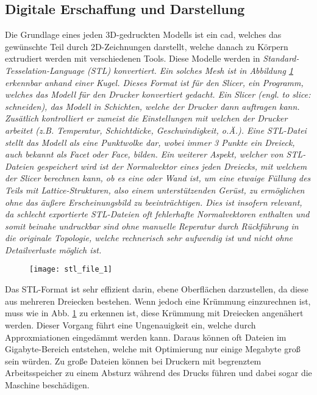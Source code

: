 \documentclass[../main.tex]{subfiles}
\begin{document}
\subsection{Digitale Erschaffung und Darstellung}
Die Grundlage eines jeden 3D-gedruckten Modells ist ein \acrfull{cad}, welches das gewünschte Teil durch 2D-Zeichnungen darstellt, welche danach zu Körpern extrudiert werden mit verschiedenen Tools. Diese Modelle werden  in \it{Standard-Tesselation-Language} (STL) konvertiert. Ein solches \it{Mesh} ist in Abbildung \ref{img:stl_1} erkennbar anhand einer Kugel. Dieses Format ist für den \it{Slicer}, ein Programm, welches das Modell für den Drucker konvertiert gedacht. Ein Slicer (engl. \it{to slice}: schneiden),  das Modell in Schichten, welche der Drucker dann auftragen kann. Zusätlich kontrolliert er zumeist die Einstellungen mit welchen der Drucker arbeitet (z.B. Temperatur, Schichtdicke, Geschwindigkeit, o.Ä.). Eine STL-Datei stellt das Modell als eine Punktwolke dar, wobei immer 3 Punkte ein Dreieck, auch bekannt als \it{Facet} oder \it{Face}, bilden. Ein weiterer Aspekt, welcher von STL-Dateien gespeichert wird ist der Normalvektor eines jeden Dreiecks, mit welchem der Slicer berechnen kann, ob es eine  oder  Wand ist, um eine etwaige Füllung des Teils mit \it{Lattice}-Strukturen, also einem unterstützenden Gerüst, zu ermöglichen ohne das äußere Erscheinungsbild zu beeinträchtigen. Dies ist insofern relevant, da schlecht exportierte STL-Dateien oft fehlerhafte Normalvektoren enthalten und somit beinahe undruckbar sind ohne manuelle Reperatur durch Rückführung in die originale Topologie, welche rechnerisch sehr aufwendig ist und nicht ohne Detailverluste möglich ist.
\begin{figure}[h]
\begin{center}
	\texttt{[image: stl\_file\_1]}
	\label{img:stl_1}
\end{center}
\end{figure}	
Das STL-Format ist sehr effizient darin, ebene Oberflächen darzustellen, da diese aus mehreren Dreiecken bestehen. Wenn jedoch eine Krümmung einzurechnen ist, muss wie in Abb. \ref{img:stl_1} zu erkennen ist, diese Krümmung mit Dreiecken angenähert werden. Dieser Vorgang führt eine Ungenauigkeit ein, welche durch Approxmiationen eingedämmt werden kann. Daraus können oft Dateien im Gigabyte-Bereich entstehen, welche mit Optimierung nur einige Megabyte groß sein würden. Zu große Dateien können bei Druckern mit begrenztem Arbeitsspeicher zu einem Absturz während des Drucks führen und dabei sogar die Maschine beschädigen. \parencite{stl_1} 
\end{document}
